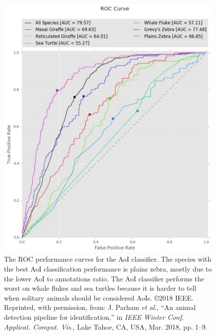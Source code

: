 \begin{figure}[!t]
    \begin{center}
        \includegraphics[width=0.9\linewidth]{resources/aoi2-roc.pdf}
    \end{center}
    \caption{The ROC performance curves for the AoI classifier.  The species with the best AoI classification performance is plains zebra, mostly due to the lower AoI to annotations ratio.  The AoI classifier performs the worst on whale flukes and sea turtles because it is harder to tell when solitary animals should be considered AoIs.  \copyright 2018 IEEE. Reprinted, with permission, from: J. Parham \textit{et al.}, ``An animal detection pipeline for identification,'' in \textit{IEEE Winter Conf. Applicat. Comput. Vis.}, Lake Tahoe, CA, USA, Mar. 2018, pp. 1–9.}
    \label{fig:aoi2-roc}
\end{figure}

